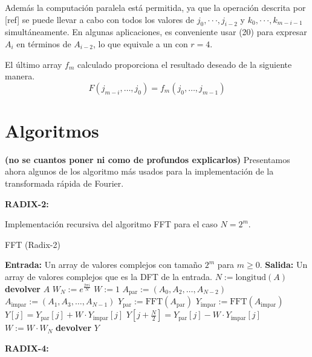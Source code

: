 \noindent Además la computación paralela está permitida, ya que la operación descrita por [ref] se puede llevar a cabo con todos los valores de \(j_0, \cdot \cdot \cdot, j_{i-2}\) y \(k_0, \cdot \cdot \cdot, k_{m-i-1}\) simultáneamente. En algunas aplicaciones, es conveniente usar (20) para expresar \(A_i\) en términos de \(A_{i-2}\), lo que equivale a un  con \(r = 4\).

\noindent El último array $f_m$ calculado proporciona el resultado deseado de la siguiente manera.
\[ F(j_{m-i}, \ldots, j_0) = f_{m} (j_{0}, \ldots, j_{m-1}) \]




\section{Algoritmos} 
\textbf{(no se cuantos poner ni como de profundos explicarlos)}
Presentamos ahora algunos de los algoritmo más usados para la implementación de la transformada rápida de Fourier.

\textbf{RADIX-2:}

Implementación recursiva del  algoritmo FFT para el caso $N=2^m$.

\begin{algorithm}
\caption{FFT (Radix-2)}
\label{alg:fft}
\begin{algorithmic}[1]
    \State \textbf{Entrada:} Un array de valores complejos con tamaño $2^m$ para $m \geq 0$.
    \State \textbf{Salida:} Un array de valores complejos que es la DFT de la entrada.
    \State $N := \text{longitud}(A)$
        \State \textbf{devolver} $A$
    \Else
        \State $W_N := e^{\frac{2\pi i}{N}}$
        \State $W := 1$
        \State $A_{\text{par}} := (A_0, A_2, \ldots, A_{N-2})$
        \State $A_{\text{impar}} := (A_1, A_3, \ldots, A_{N-1})$
        \State $Y_{\text{par}} := \text{FFT}(A_{\text{par}})$
        \State $Y_{\text{impar}} := \text{FFT}(A_{\text{impar}})$
            \State $Y[j] = Y_{\text{par}}[j] + W \cdot Y_{\text{impar}}[j]$
            \State $Y[j + \frac{N}{2}] = Y_{\text{par}}[j] - W \cdot Y_{\text{impar}}[j]$
            \State $W := W \cdot W_N$
        \EndFor
        \State \textbf{devolver} $Y$
    \EndIf
\EndProcedure
\end{algorithmic}
\end{algorithm}



\textbf{RADIX-4:}

